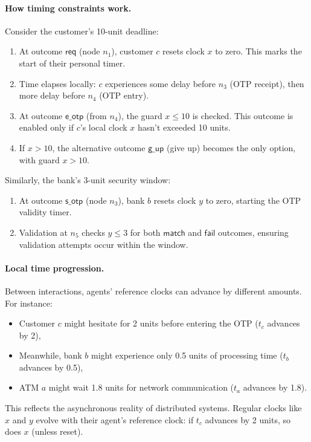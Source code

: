 \paragraph{How timing constraints work.} Consider the customer's 10-unit deadline:
\begin{enumerate}
\item At outcome $\mathsf{req}$ (node $n_1$), customer $c$ resets clock $x$ to zero. This marks the start of their personal timer.
\item Time elapses locally: $c$ experiences some delay before $n_3$ (OTP receipt), then more delay before $n_4$ (OTP entry).
\item At outcome $\mathsf{e\_otp}$ (from $n_4$), the guard $x \leq 10$ is checked. This outcome is enabled only if $c$'s local clock $x$ hasn't exceeded 10 units.
\item If $x > 10$, the alternative outcome $\mathsf{g\_up}$ (give up) becomes the only option, with guard $x > 10$.
\end{enumerate}

Similarly, the bank's 3-unit security window:
\begin{enumerate}
\item At outcome $\mathsf{s\_otp}$ (node $n_3$), bank $b$ resets clock $y$ to zero, starting the OTP validity timer.
\item Validation at $n_5$ checks $y \leq 3$ for both $\mathsf{match}$ and $\mathsf{fail}$ outcomes, ensuring validation attempts occur within the window.
\end{enumerate}

\paragraph{Local time progression.} Between interactions, agents' reference clocks can advance by different amounts. For instance:
\begin{itemize}
\item Customer $c$ might hesitate for 2 units before entering the OTP ($t_c$ advances by 2),
\item Meanwhile, bank $b$ might experience only 0.5 units of processing time ($t_b$ advances by 0.5),
\item ATM $a$ might wait 1.8 units for network communication ($t_a$ advances by 1.8).
\end{itemize}

This reflects the asynchronous reality of distributed systems. Regular clocks like $x$ and $y$ evolve with their agent's reference clock: if $t_c$ advances by 2 units, so does $x$ (unless reset).

